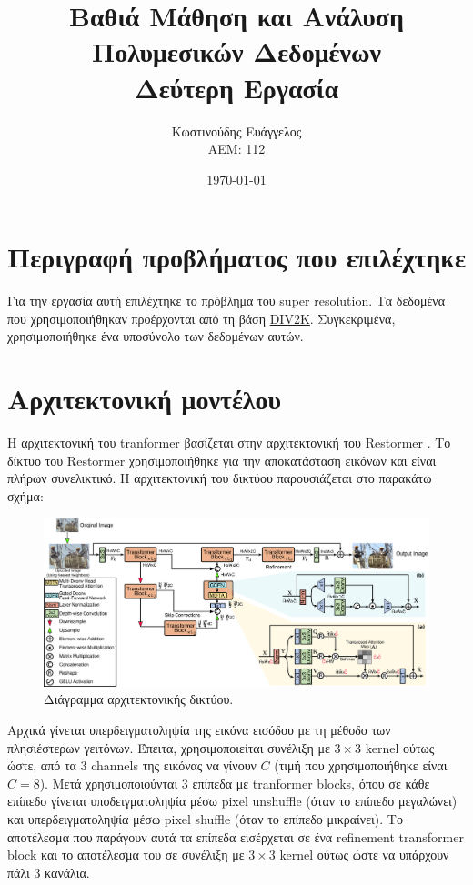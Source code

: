 \documentclass[a4paper]{article}
\title{Βαθιά Μάθηση και Ανάλυση Πολυμεσικών Δεδομένων \\ Δεύτερη Εργασία}
\author{Κωστινούδης Ευάγγελος \\ΑΕΜ: 112}
\date{\today}
\begin{document}
\maketitle
{}
\newpage
{}

\section{Περιγραφή προβλήματος που επιλέχτηκε}

Για την εργασία αυτή επιλέχτηκε το πρόβλημα του super resolution. Τα δεδομένα
που χρησιμοποιήθηκαν προέρχονται από τη βάση
\href{https://data.vision.ee.ethz.ch/cvl/DIV2K/}{DIV2K}. Συγκεκριμένα,
χρησιμοποιήθηκε ένα υποσύνολο των δεδομένων αυτών.


\section{Αρχιτεκτονική μοντέλου}

Η αρχιτεκτονική του tranformer βασίζεται στην αρχιτεκτονική του Restormer
\cite{restormer}. Το δίκτυο του Restormer χρησιμοποιήθηκε για την αποκατάσταση
εικόνων και είναι πλήρων συνελικτικό.  Η αρχιτεκτονική του δικτύου παρουσιάζεται
στο παρακάτω σχήμα:

\begin{figure}[H]
    \centering

    \includegraphics[width=.95\linewidth]{model.png}

    \caption{Διάγραμμα αρχιτεκτονικής δικτύου.}
    \label{fig:model}
\end{figure}

Αρχικά γίνεται υπερδειγματοληψία της εικόνα εισόδου με τη μέθοδο των
πλησιέστερων γειτόνων. Έπειτα, χρησιμοποιείται συνέλιξη με $3\times3$ kernel
ούτως ώστε, από τα 3 channels της εικόνας να γίνουν $C$ (τιμή που
χρησιμοποιήθηκε είναι $C=8$). Μετά χρησιμοποιούνται 3 επίπεδα με tranformer
blocks, όπου σε κάθε επίπεδο γίνεται υποδειγματοληψία μέσω pixel unshuffle (όταν
το επίπεδο μεγαλώνει) και υπερδειγματοληψία μέσω pixel shuffle (όταν το επίπεδο
μικραίνει). Το αποτέλεσμα που παράγουν αυτά τα επίπεδα εισέρχεται σε ένα
refinement transformer block και το αποτέλεσμα του σε συνέλιξη με $3\times3$
kernel ούτως ώστε να υπάρχουν πάλι 3 κανάλια.
\end{document}
